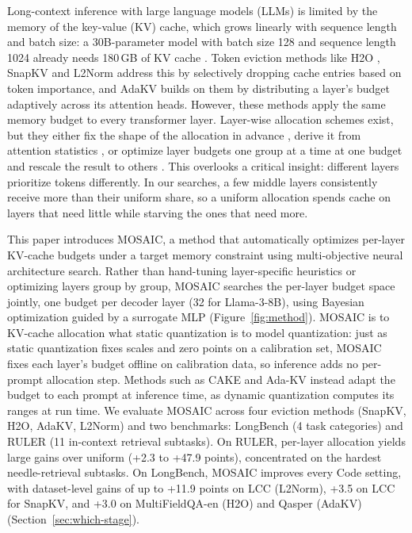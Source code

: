 \documentclass[11pt]{article}
\begin{document}
Long-context inference with large language models (LLMs) is limited by the memory of the key-value (KV) cache, which grows linearly with sequence length and batch size: a 30B-parameter model with batch size 128 and sequence length 1024 already needs 180\,GB of KV cache \citep{zhang2023h2o}. Token eviction methods like H2O \citep{zhang2023h2o}, SnapKV \citep{li2024snapkv} and L2Norm \citep{devoto2024l2norm} address this by selectively dropping cache entries based on token importance, and AdaKV \citep{feng2025adakv} builds on them by distributing a layer's budget adaptively across its attention heads. However, these methods apply the same memory budget to every transformer layer. Layer-wise allocation schemes exist, but they either fix the shape of the allocation in advance \citep{cai2025pyramidkv}, derive it from attention statistics \citep{qin2025cake}, or optimize layer budgets one group at a time at one budget and rescale the result to others \citep{yu2025evolkv}. This overlooks a critical insight: different layers prioritize tokens differently. In our searches, a few middle layers consistently receive more than their uniform share, so a uniform allocation spends cache on layers that need little while starving the ones that need more.

This paper introduces MOSAIC, a method that automatically optimizes per-layer KV-cache budgets under a target memory constraint using multi-objective neural architecture search. Rather than hand-tuning layer-specific heuristics or optimizing layers group by group, MOSAIC searches the per-layer budget space jointly, one budget per decoder layer (32 for Llama-3-8B), using Bayesian optimization guided by a surrogate MLP (Figure~\ref{fig:method}). MOSAIC is to KV-cache allocation what static quantization is to model quantization: just as static quantization fixes scales and zero points on a calibration set, MOSAIC fixes each layer's budget offline on calibration data, so inference adds no per-prompt allocation step. Methods such as CAKE and Ada-KV instead adapt the budget to each prompt at inference time, as dynamic quantization computes its ranges at run time. We evaluate MOSAIC across four eviction methods (SnapKV, H2O, AdaKV, L2Norm) and two benchmarks: LongBench (4 task categories) and RULER (11 in-context retrieval subtasks). On RULER, per-layer allocation yields large gains over uniform (+2.3 to +47.9 points), concentrated on the hardest needle-retrieval subtasks. On LongBench, MOSAIC improves every Code setting, with dataset-level gains of up to +11.9 points on LCC (L2Norm), +3.5 on LCC for SnapKV, and +3.0 on MultiFieldQA-en (H2O) and Qasper (AdaKV) (Section~\ref{sec:which-stage}).
\end{document}
